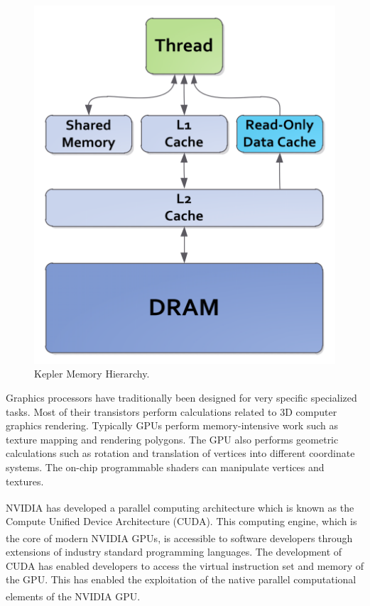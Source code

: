 \begin{figure} [H]
    \centering
    \vspace{0.5in}
    \includegraphics[scale=0.40]{Images/memory}
    \vspace{0.5in}
    \caption{Kepler Memory Hierarchy.}
    \label{fig:memory}
\end{figure}


Graphics processors have traditionally been designed for very specific
specialized tasks.  Most of their transistors perform calculations related
to 3D computer graphics rendering.  Typically GPUs perform memory-intensive
work such as texture mapping and rendering polygons.  The GPU also performs
geometric calculations such as rotation and translation of vertices into
different coordinate systems.  The on-chip programmable shaders can manipulate 
vertices and textures.  

NVIDIA\textsuperscript{\textregistered} has developed a parallel computing
architecture which is known as the Compute Unified Device Architecture (CUDA).  
This computing engine, which is the core of modern
NVIDIA\textsuperscript{\textregistered} GPUs, is accessible to software
developers through extensions of industry standard programming languages.  The
development of CUDA has enabled developers to access the virtual instruction
set and memory of the GPU. This has enabled the exploitation of the native
parallel computational elements of the NVIDIA\textsuperscript{\textregistered}
GPU. 

